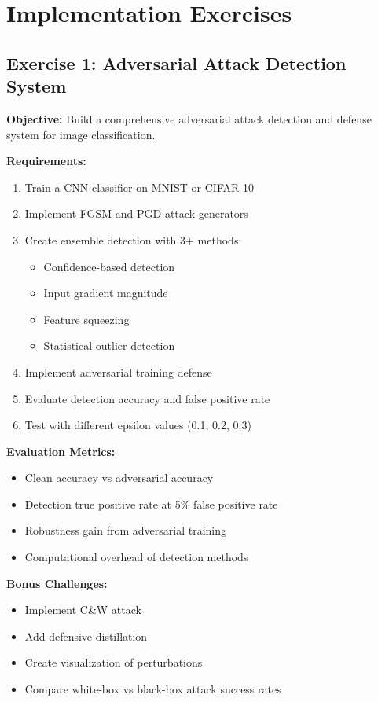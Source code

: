 \section{Implementation Exercises}

\subsection{Exercise 1: Adversarial Attack Detection System}

\textbf{Objective:} Build a comprehensive adversarial attack detection and defense system for image classification.

\textbf{Requirements:}
\begin{enumerate}
    \item Train a CNN classifier on MNIST or CIFAR-10
    \item Implement FGSM and PGD attack generators
    \item Create ensemble detection with 3+ methods:
    \begin{itemize}
        \item Confidence-based detection
        \item Input gradient magnitude
        \item Feature squeezing
        \item Statistical outlier detection
    \end{itemize}
    \item Implement adversarial training defense
    \item Evaluate detection accuracy and false positive rate
    \item Test with different epsilon values (0.1, 0.2, 0.3)
\end{enumerate}

\textbf{Evaluation Metrics:}
\begin{itemize}
    \item Clean accuracy vs adversarial accuracy
    \item Detection true positive rate at 5\% false positive rate
    \item Robustness gain from adversarial training
    \item Computational overhead of detection methods
\end{itemize}

\textbf{Bonus Challenges:}
\begin{itemize}
    \item Implement C\&W attack
    \item Add defensive distillation
    \item Create visualization of perturbations
    \item Compare white-box vs black-box attack success rates
\end{itemize}

